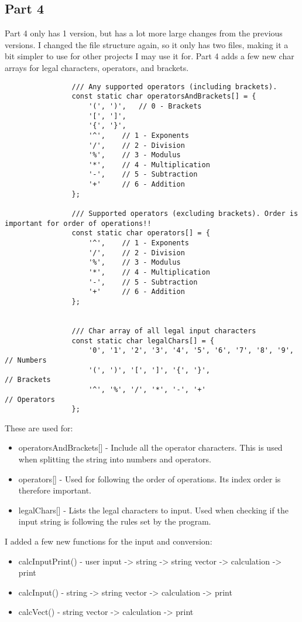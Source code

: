 \documentclass{article}
\begin{document}
		
		\subsection{Part 4}
			Part 4 only has 1 version, but has a lot more large changes from the previous versions. I changed the file structure again, so it only has two files, making it a bit simpler to use for other projects I may use it for.
			Part 4 adds a few new char arrays for legal characters, operators, and brackets.
			\begin{lstlisting}
				/// Any supported operators (including brackets).
				const static char operatorsAndBrackets[] = {
					'(', ')',   // 0 - Brackets
					'[', ']',
					'{', '}',
					'^',    // 1 - Exponents
					'/',    // 2 - Division
					'%',    // 3 - Modulus
					'*',    // 4 - Multiplication
					'-',    // 5 - Subtraction
					'+'     // 6 - Addition
				};
				
				/// Supported operators (excluding brackets). Order is important for order of operations!!
				const static char operators[] = {
					'^',    // 1 - Exponents
					'/',    // 2 - Division
					'%',    // 3 - Modulus
					'*',    // 4 - Multiplication
					'-',    // 5 - Subtraction
					'+'     // 6 - Addition
				};
				
				
				/// Char array of all legal input characters
				const static char legalChars[] = {
					'0', '1', '2', '3', '4', '5', '6', '7', '8', '9',   // Numbers
					'(', ')', '[', ']', '{', '}',                       // Brackets
					'^', '%', '/', '*', '-', '+'                        // Operators
				};
			\end{lstlisting}
			
			These are used for:
			\begin{itemize}
				\item operatorsAndBrackets[] 	- Include all the operator characters. This is used when splitting the string into numbers and operators.
				\item operators[]				- Used for following the order of operations. Its index order is therefore important.
				\item legalChars[]				- Lists the legal characters to input. Used when checking if the input string is following the rules set by the program.
			\end{itemize}
			
			I added a few new functions for the input and conversion:
			\begin{itemize}
				\item calcInputPrint()	- user input -> string -> string vector -> calculation -> print
				\item calcInput()		- string -> string vector -> calculation -> print
				\item calcVect()		- string vector -> calculation -> print
			\end{itemize}
		
\end{document}
